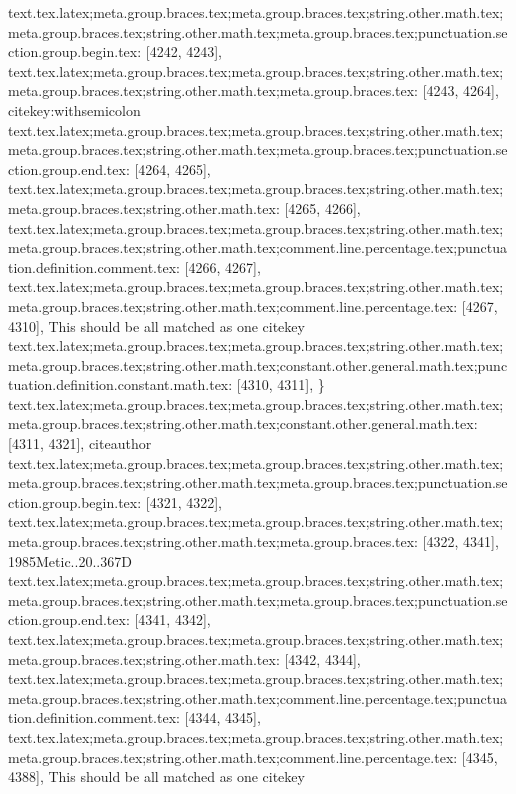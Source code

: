 {{{{{{{{{{{{{{{{{{{{{{{{{{{{{{{{{{{{{{{{{{{{{{{{{{{{{{{{{{{{{{{{{{{{{{{{{{{{{{{{{{{{{{{{{{{{{{{{{{{{{{{{{{{{{{{{{{{{{{{{{{{{{{{{{{{{{{{text.tex.latex;meta.group.braces.tex;meta.group.braces.tex;string.other.math.tex;meta.group.braces.tex;string.other.math.tex;meta.group.braces.tex;punctuation.section.group.begin.tex: [4242, 4243], {{}
text.tex.latex;meta.group.braces.tex;meta.group.braces.tex;string.other.math.tex;meta.group.braces.tex;string.other.math.tex;meta.group.braces.tex: [4243, 4264], {citekey:withsemicolon}
text.tex.latex;meta.group.braces.tex;meta.group.braces.tex;string.other.math.tex;meta.group.braces.tex;string.other.math.tex;meta.group.braces.tex;punctuation.section.group.end.tex: [4264, 4265], {}}
text.tex.latex;meta.group.braces.tex;meta.group.braces.tex;string.other.math.tex;meta.group.braces.tex;string.other.math.tex: [4265, 4266], { }
text.tex.latex;meta.group.braces.tex;meta.group.braces.tex;string.other.math.tex;meta.group.braces.tex;string.other.math.tex;comment.line.percentage.tex;punctuation.definition.comment.tex: [4266, 4267], {%
text.tex.latex;meta.group.braces.tex;meta.group.braces.tex;string.other.math.tex;meta.group.braces.tex;string.other.math.tex;comment.line.percentage.tex: [4267, 4310], { This should be all matched as one citekey
}
text.tex.latex;meta.group.braces.tex;meta.group.braces.tex;string.other.math.tex;meta.group.braces.tex;string.other.math.tex;constant.other.general.math.tex;punctuation.definition.constant.math.tex: [4310, 4311], {\}
text.tex.latex;meta.group.braces.tex;meta.group.braces.tex;string.other.math.tex;meta.group.braces.tex;string.other.math.tex;constant.other.general.math.tex: [4311, 4321], {citeauthor}
text.tex.latex;meta.group.braces.tex;meta.group.braces.tex;string.other.math.tex;meta.group.braces.tex;string.other.math.tex;meta.group.braces.tex;punctuation.section.group.begin.tex: [4321, 4322], {{}
text.tex.latex;meta.group.braces.tex;meta.group.braces.tex;string.other.math.tex;meta.group.braces.tex;string.other.math.tex;meta.group.braces.tex: [4322, 4341], {1985Metic..20..367D}
text.tex.latex;meta.group.braces.tex;meta.group.braces.tex;string.other.math.tex;meta.group.braces.tex;string.other.math.tex;meta.group.braces.tex;punctuation.section.group.end.tex: [4341, 4342], {}}
text.tex.latex;meta.group.braces.tex;meta.group.braces.tex;string.other.math.tex;meta.group.braces.tex;string.other.math.tex: [4342, 4344], {  }
text.tex.latex;meta.group.braces.tex;meta.group.braces.tex;string.other.math.tex;meta.group.braces.tex;string.other.math.tex;comment.line.percentage.tex;punctuation.definition.comment.tex: [4344, 4345], {%
text.tex.latex;meta.group.braces.tex;meta.group.braces.tex;string.other.math.tex;meta.group.braces.tex;string.other.math.tex;comment.line.percentage.tex: [4345, 4388], { This should be all matched as one citekey
}}}}}}}}}}}}}}}}}}}}}}}}}}}}}}}}}}}}}}}}}}}}}}}}}}}}}}}}}}}}}}}}}}}}}}}}}}}}}}}}}}}}}}}}}}}}}}}}}}}}}}}}}}}}}}}}}}}}}}}}}}}}}}}}}}}}}}}}}}}
